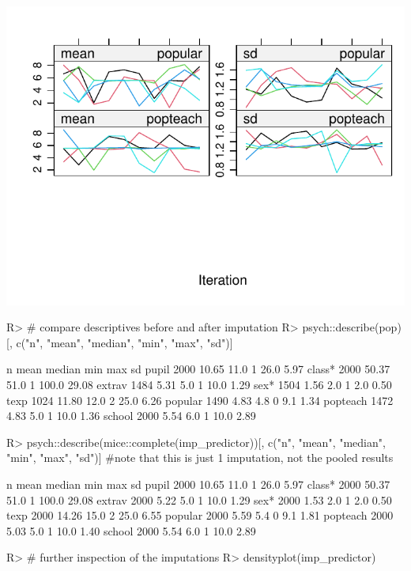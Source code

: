 \documentclass[
]{jss}
\begin{document}
\begin{CodeChunk}
\begin{center}\includegraphics{Manuscript_files/figure-latex/pop-predictor-2} \end{center}

\begin{CodeInput}
R> # compare descriptives before and after imputation
R> psych::describe(pop)[, c("n", "mean", "median", "min", "max", "sd")]
\end{CodeInput}
\begin{CodeOutput}
            n  mean median min   max    sd
pupil    2000 10.65   11.0   1  26.0  5.97
class*   2000 50.37   51.0   1 100.0 29.08
extrav   1484  5.31    5.0   1  10.0  1.29
sex*     1504  1.56    2.0   1   2.0  0.50
texp     1024 11.80   12.0   2  25.0  6.26
popular  1490  4.83    4.8   0   9.1  1.34
popteach 1472  4.83    5.0   1  10.0  1.36
school   2000  5.54    6.0   1  10.0  2.89
\end{CodeOutput}
\begin{CodeInput}
R> psych::describe(mice::complete(imp_predictor))[, c("n", "mean", "median", "min", "max", "sd")] #note that this is just 1 imputation, not the pooled results
\end{CodeInput}
\begin{CodeOutput}
            n  mean median min   max    sd
pupil    2000 10.65   11.0   1  26.0  5.97
class*   2000 50.37   51.0   1 100.0 29.08
extrav   2000  5.22    5.0   1  10.0  1.29
sex*     2000  1.53    2.0   1   2.0  0.50
texp     2000 14.26   15.0   2  25.0  6.55
popular  2000  5.59    5.4   0   9.1  1.81
popteach 2000  5.03    5.0   1  10.0  1.40
school   2000  5.54    6.0   1  10.0  2.89
\end{CodeOutput}
\begin{CodeInput}
R> # further inspection of the imputations
R> densityplot(imp_predictor)
\end{CodeInput}



\end{CodeChunk}
\end{document}
